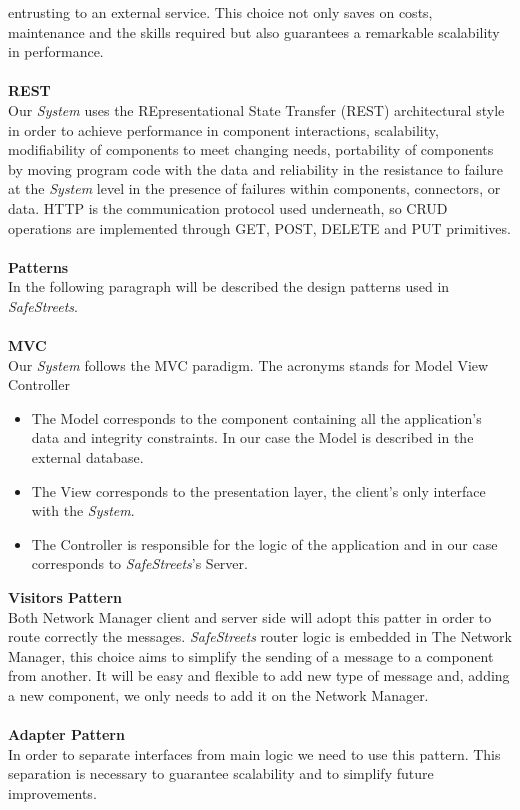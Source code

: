\documentclass{article}
\begin{document}
entrusting to an external service. This choice not only saves on costs, maintenance and 
the skills required but also guarantees a remarkable scalability in performance.
\\
\\
\textbf{REST} \\
Our \textit{System} uses the REpresentational State Transfer (REST) architectural style in order to achieve 
performance in component interactions, scalability, modifiability of components to meet changing needs, portability 
of components by moving program code with the data and reliability in the resistance to failure at the \textit{System} level
in the presence of failures within components, connectors, or data. HTTP is the communication protocol used underneath, 
so CRUD operations are implemented through GET, POST, DELETE and PUT primitives.
\\
\\
\textbf{Patterns}\\
In the following paragraph will be described the design patterns used in \textit{SafeStreets}. 
\\
\\
\textbf{MVC}\\
Our \textit{System} follows the MVC paradigm. The acronyms stands for Model View Controller

\begin{itemize}
    \item The Model corresponds to the component containing all the application's data and integrity constraints. 
    In our case the Model is described in the external database.
    \item The View corresponds to the presentation layer, the client's only interface with the \textit{System}.
    \item The Controller is responsible for the logic of the application and in our case corresponds to \textit{SafeStreets}'s Server.
\end{itemize}
\textbf{Visitors Pattern}\\
Both Network Manager client and server side will adopt this patter in order to route correctly the messages. \textit{SafeStreets}
router logic is embedded in The Network Manager, this choice aims to simplify the sending of a message to a component
from another. It will be easy and flexible to add new type of message and, adding a new component, we only needs to 
add it on the Network Manager.
\\
\\
\textbf{Adapter Pattern}\\
In order to separate interfaces from main logic we need to use this pattern. This separation is necessary to guarantee
scalability and to simplify future improvements.
\end{document}
